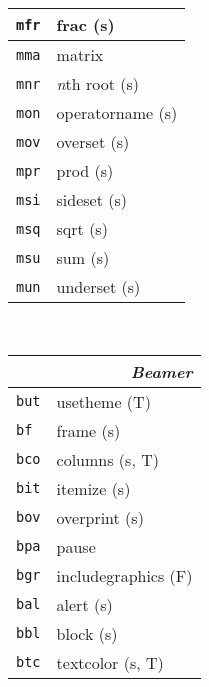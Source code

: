 \documentclass[oneside,10pt,landscape,DIV16]{scrartcl}
\newcommand{\Map}[1] {\textbf{\textasciiacute}\texttt{#1}}
\begin{document}
\begin{multicols}{3}
\begin{center}
\begin{tabular}[]{|p{11mm}|p{62mm}|}
\hline  \Map{mfr} & frac                      \hfill (s)\\
\hline  \Map{mma} & matrix                    \\
\hline  \Map{mnr} & \textit{n}th root         \hfill (s)\\
\hline  \Map{mon} & operatorname              \hfill (s)\\
\hline  \Map{mov} & overset                   \hfill (s)\\
\hline  \Map{mpr} & prod                      \hfill (s)\\
\hline  \Map{msi} & sideset                   \hfill (s)\\
\hline  \Map{msq} & sqrt                      \hfill (s)\\
\hline  \Map{msu} & sum                       \hfill (s)\\
\hline  \Map{mun} & underset                  \hfill (s)\\
\hline
%
\end{tabular}\\
%
\newpage
%
\begin{tabular}[]{|p{11mm}|p{60mm}|}
\hline
\multicolumn{2}{|r|}{\textsl{B\textbf{e}amer}}\\[1.0ex]
\hline \Map{but} & usetheme        \hfill (T)\\
\hline \Map{bf}  & frame           \hfill (s)\\
\hline \Map{bco} & columns         \hfill (s, T)\\
\hline \Map{bit} & itemize         \hfill (s)\\
\hline \Map{bov} & overprint       \hfill (s)\\
\hline \Map{bpa} & pause           \\
\hline \Map{bgr} & includegraphics \hfill (F)\\
\hline \Map{bal} & alert           \hfill (s)\\
\hline \Map{bbl} & block           \hfill (s)\\
\hline \Map{btc} & textcolor       \hfill (s, T)\\
\hline

\end{tabular}
\end{center}
\end{multicols}
\end{document}
